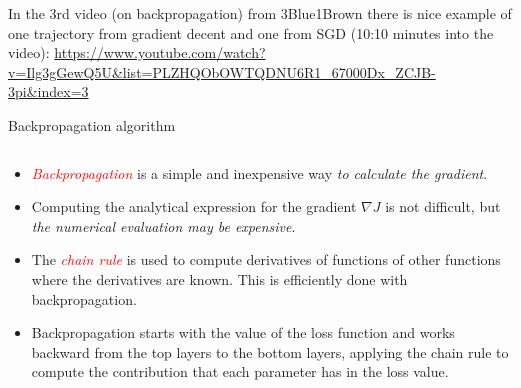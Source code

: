 \documentclass[10pt,ignorenonframetext,]{beamer}
\providecommand{\tightlist}{%
  \setlength{\itemsep}{0pt}\setlength{\parskip}{0pt}}
\begin{document}
\begin{frame}

In the 3rd video (on backpropagation) from 3Blue1Brown there is nice
example of one trajectory from gradient decent and one from SGD (10:10
minutes into the video):
\url{https://www.youtube.com/watch?v=Ilg3gGewQ5U\&list=PLZHQObOWTQDNU6R1_67000Dx_ZCJB-3pi\&index=3}

\end{frame}

\begin{frame}

\begin{block}{Backpropagation algorithm}

\(~\)

\begin{itemize}
\tightlist
\item
  \emph{\textcolor{red}{Backpropagation}} is a simple and inexpensive
  way \emph{to calculate the gradient}.
\end{itemize}

\vspace{2mm}

\begin{itemize}
\tightlist
\item
  Computing the analytical expression for the gradient \(\nabla J\) is
  not difficult, but \emph{the numerical evaluation may be expensive}.
\end{itemize}

\vspace{2mm}

\vspace{2mm}

\begin{itemize}
\tightlist
\item
  The \emph{\textcolor{red}{chain rule}} is used to compute derivatives
  of functions of other functions where the derivatives are known. This
  is efficiently done with backpropagation.
\end{itemize}

\vspace{2mm}

\begin{itemize}
\tightlist
\item
  Backpropagation starts with the value of the loss function and works
  backward from the top layers to the bottom layers, applying the chain
  rule to compute the contribution that each parameter has in the loss
  value.
\end{itemize}

\end{block}

\end{frame}
\end{document}

